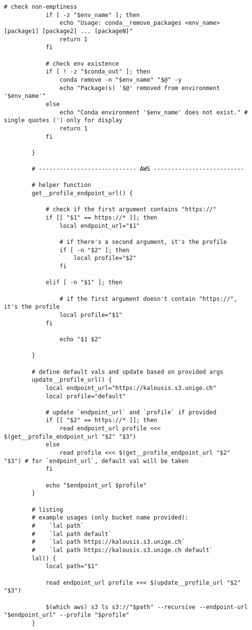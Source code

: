 \documentclass[12pt, a4paper]{scrbook}
\numberwithin{equation}{section}
\theoremstyle{definition}
\theoremstyle{definition}
\begin{document}
\begin{lstlisting}[style=mystylebash, label=alg:bashrc_contents, xleftmargin=\parindent]
			# check non-emptiness
			if [ -z "$env_name" ]; then
				echo "Usage: conda__remove_packages <env_name> [package1] [package2] ... [packageN]"
				return 1
			fi 
			
			# check env existence
			if [ ! -z "$conda_out" ]; then
				conda remove -n "$env_name" "$@" -y
				echo "Package(s) '$@' removed from environment '$env_name'"
			else
				echo "Conda environment '$env_name' does not exist." # single quotes (') only for display
				return 1	
			fi
			
		}
	
		# ---------------------------- AWS --------------------------
		
		# helper function
		get__profile_endpoint_url() {
			
			# check if the first argument contains "https://"                                       
			if [[ "$1" == https://* ]]; then
				local endpoint_url="$1"
			
				# if there's a second argument, it's the profile
				if [ -n "$2" ]; then
					local profile="$2"
				fi
			
			elif [ -n "$1" ]; then
			
				# if the first argument doesn't contain "https://", it's the profile
				local profile="$1"
			fi
				
				echo "$1 $2"
			
		}
		
		# define default vals and update based on provided args
		update__profile_url() {
			local endpoint_url="https://kalousis.s3.unige.ch"
			local profile="default"
			
			# update `endpoint_url` and `profile` if provided
			if [[ "$2" == https://* ]]; then
				read endpoint_url profile <<< $(get__profile_endpoint_url "$2" "$3")
			else 
				read profile <<< $(get__profile_endpoint_url "$2" "$3") # for `endpoint_url`, default val will be taken
			fi
			
			echo "$endpoint_url $profile"
		}
		
		# listing
		# example usages (only bucket name provided):
		#    `lal path`
		#    `lal path default`
		#    `lal path https://kalousis.s3.unige.ch`
		#    `lal path https://kalousis.s3.unige.ch default`
		lal() {
			local path="$1"
			
			read endpoint_url profile <<< $(update__profile_url "$2" "$3")
			
			$(which aws) s3 ls s3://"$path" --recursive --endpoint-url "$endpoint_url" --profile "$profile"
		}
		

\end{lstlisting}
\end{document}
